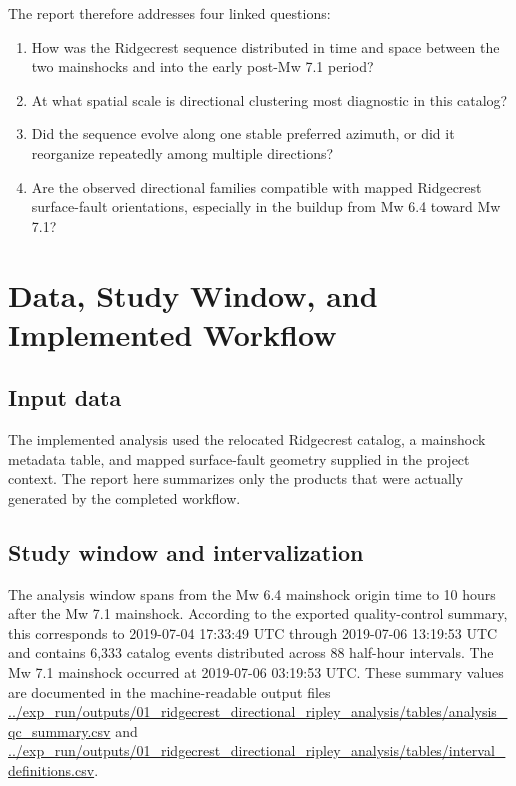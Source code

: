 \documentclass[11pt]{article}
\begin{document}
The report therefore addresses four linked questions:
\begin{enumerate}[leftmargin=2em]
    \item How was the Ridgecrest sequence distributed in time and space between the two mainshocks and into the early post-Mw 7.1 period?
    \item At what spatial scale is directional clustering most diagnostic in this catalog?
    \item Did the sequence evolve along one stable preferred azimuth, or did it reorganize repeatedly among multiple directions?
    \item Are the observed directional families compatible with mapped Ridgecrest surface-fault orientations, especially in the buildup from Mw 6.4 toward Mw 7.1?
\end{enumerate}

\section{Data, Study Window, and Implemented Workflow}
\subsection{Input data}
The implemented analysis used the relocated Ridgecrest catalog, a mainshock metadata table, and mapped surface-fault geometry supplied in the project context. The report here summarizes only the products that were actually generated by the completed workflow.

\subsection{Study window and intervalization}
The analysis window spans from the Mw 6.4 mainshock origin time to 10 hours after the Mw 7.1 mainshock. According to the exported quality-control summary, this corresponds to 2019-07-04 17:33:49 UTC through 2019-07-06 13:19:53 UTC and contains 6,333 catalog events distributed across 88 half-hour intervals. The Mw 7.1 mainshock occurred at 2019-07-06 03:19:53 UTC. These summary values are documented in the machine-readable output files
\url{../exp_run/outputs/01_ridgecrest_directional_ripley_analysis/tables/analysis_qc_summary.csv}
and
\url{../exp_run/outputs/01_ridgecrest_directional_ripley_analysis/tables/interval_definitions.csv}.
\end{document}
